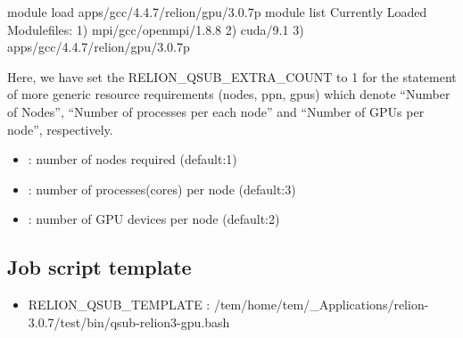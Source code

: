 \documentclass[letterpaper,10pt,english]{sphinxmanual}
\begin{document}
\begin{sphinxVerbatim}[commandchars=\\\{\}]
\PYGZdl{}\PYGZgt{} module load apps/gcc/4.4.7/relion/gpu/3.0.7p
\PYGZdl{}\PYGZgt{} module list
Currently Loaded Modulefiles:
  1) mpi/gcc/openmpi/1.8.8              2) cuda/9.1                           3) apps/gcc/4.4.7/relion/gpu/3.0.7p
\end{sphinxVerbatim}

Here, we have set the RELION\_QSUB\_EXTRA\_COUNT to 1 for the statement of more generic resource requirements (nodes, ppn, gpus) which denote “Number of Nodes”, “Number of processes per each node” and “Number of GPUs per node”, respectively.
\begin{itemize}
\item {} 
 : number of nodes required (default:1)

\item {} 
 : number of processes(cores) per node (default:3)

\item {} 
 : number of GPU devices per node (default:2)

\end{itemize}


\subsection{Job script template}
\label{\detokenize{relion:job-script-template}}\begin{itemize}
\item {} 
RELION\_QSUB\_TEMPLATE : /tem/home/tem/\_Applications/relion-3.0.7/test/bin/qsub-relion3-gpu.bash

\end{itemize}
\end{document}
